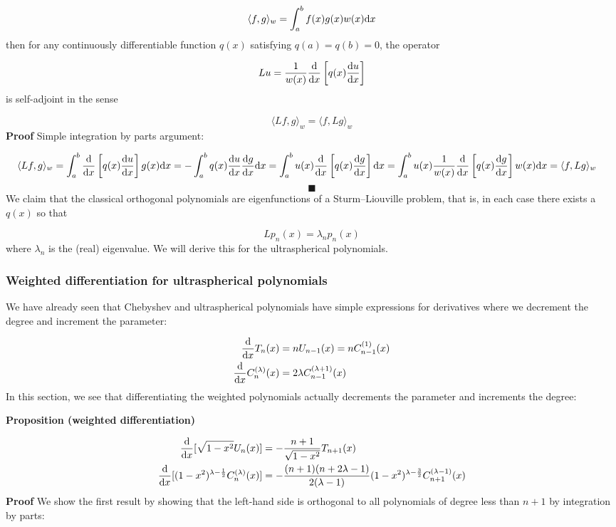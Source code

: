 \documentclass[12pt,a4paper]{article}
\def\endash{–}
\begin{document}
\[
\langle f,g\rangle_w = \int_a^b f(x) g(x) w(x) {\rm d}x
\]
then for any continuously differentiable function $q(x)$ satisfying $q(a) = q(b) = 0$, the operator

\[
Lu = {1 \over w(x)} {{\rm d} \over {\rm d}x}\left[ q(x) {{\rm d} u\over {\rm d}x} \right]
\]
is self-adjoint in the sense

\[
\langle L f,g\rangle_w = \langle f, Lg\rangle_w
\]
\textbf{Proof} Simple integration by parts argument:


\begin{align*}
\langle L f,g\rangle_w &= \int_a^b {{\rm d} \over {\rm d}x}\left[ q(x) {{\rm d} u\over {\rm d}x}\right]  g(x){\rm d}x 
=  -\int_a^b q(x) {{\rm d} u\over {\rm d}x}    {{\rm d} g\over {\rm d}x} {\rm d}x =  \int_a^b   u(x)  {{\rm d} \over {\rm d}x} \left[ q(x) {{\rm d} g\over {\rm d}x}\right] {\rm d}x 
=
 \int_a^b   u(x)  {1 \over w(x)} {{\rm d} \over {\rm d}x}\left[q(x) {{\rm d} g\over {\rm d}x}\right] w(x) {\rm d}x = \langle f, Lg\rangle_w
 \end{align*}
\[
\blacksquare
\]
We claim that the classical orthogonal polynomials are eigenfunctions of a Sturm\ensuremath{\endash}Liouville problem, that is, in each case there exists a $q(x)$ so that

\[
L p_n(x) = \lambda_n p_n(x)
\]
where $\lambda_n$ is the (real) eigenvalue. We will derive this for the ultraspherical polynomials.

\subsubsection{Weighted differentiation for ultraspherical polynomials}
We have already seen that Chebyshev and ultraspherical polynomials have simple expressions for derivatives where we decrement the degree and increment the parameter:


\begin{align*}
{{\rm d} \over {\rm d}x } T_n(x) & = n U_{n-1}(x) = n C_{n-1}^{(1)}(x) \\
{{\rm d} \over {\rm d}x } C_n^{(\lambda)}(x) &= 2 \lambda C_{n-1}^{(\lambda+1)}(x)
\end{align*}
In this section, we see that differentiating the weighted polynomials actually decrements the parameter and increments the degree:

\textbf{Proposition (weighted differentiation)}


\begin{align*}
{{\rm d} \over {\rm d}x }[\sqrt{1-x^2} U_n(x)] &= - {n+1 \over \sqrt{1-x^2}} T_{n+1}(x) \\
{{\rm d} \over {\rm d}x }[(1-x^2)^{\lambda-{1 \over 2}} C_n^{(\lambda)}(x)] & = -{(n+1) (n+2 \lambda-1) \over 2 (\lambda-1) }  (1-x^2)^{\lambda - {3 \over 2}} C_{n+1}^{(\lambda-1)}(x)
\end{align*}
\textbf{Proof} We show the first result by showing that the left-hand side is orthogonal to all  polynomials of degree less than $n+1$ by integration by parts:
\end{document}
